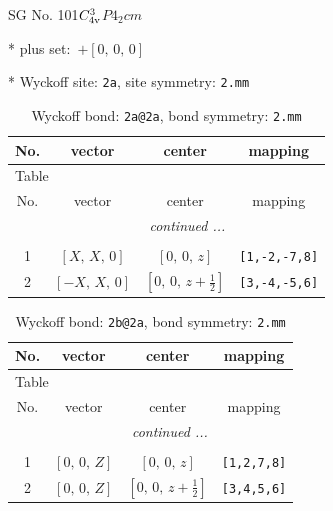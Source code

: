 \documentclass[fleqn,8pt]{jsarticle}
\begin{document}
\setcounter{MaxMatrixCols}{32}

\renewcommand{\tablename}{Table~}
\renewcommand{\figurename}{Figure~}
\begin{center}
\LARGE
SG No. 101\quad$C_{\rm 4v}^{3}$\quad$P4_2cm$\quad[ tetragonal ]
\end{center}

* plus set:\,\,\,$+\left[ 0,\, 0,\, 0 \right]$


* Wyckoff site: {\tt 2a}, site symmetry: {\tt 2.mm}
\renewcommand{\arraystretch}{1.2}
\begin{longtable}{cccc}
\caption{Wyckoff bond: {\tt 2a@2a}, bond symmetry: {\tt 2.mm}}
 \\
 \hline \hline
No. & vector & center & mapping \\ \hline \endfirsthead

\multicolumn{3}{l}{\tablename\ \thetable{}} \\
 \hline \hline
No. & vector & center & mapping \\ \hline \endhead

 \hline \hline
\multicolumn{3}{r}{\footnotesize\it continued ...} \\ \endfoot

 \hline \hline
\multicolumn{3}{r}{} \\ \endlastfoot

1 & $\left[ X,\, X,\, 0 \right]$ & $\left[ 0,\, 0,\, z \right]$ & {\tt [1,-2,-7,8]} \\ \hline
2 & $\left[ - X,\, X,\, 0 \right]$ & $\left[ 0,\, 0,\, z + \frac{1}{2} \right]$ & {\tt [3,-4,-5,6]} \\
\end{longtable}
\renewcommand{\arraystretch}{1.2}
\begin{longtable}{cccc}
\caption{Wyckoff bond: {\tt 2b@2a}, bond symmetry: {\tt 2.mm}}
 \\
 \hline \hline
No. & vector & center & mapping \\ \hline \endfirsthead

\multicolumn{3}{l}{\tablename\ \thetable{}} \\
 \hline \hline
No. & vector & center & mapping \\ \hline \endhead

 \hline \hline
\multicolumn{3}{r}{\footnotesize\it continued ...} \\ \endfoot

 \hline \hline
\multicolumn{3}{r}{} \\ \endlastfoot

1 & $\left[ 0,\, 0,\, Z \right]$ & $\left[ 0,\, 0,\, z \right]$ & {\tt [1,2,7,8]} \\ \hline
2 & $\left[ 0,\, 0,\, Z \right]$ & $\left[ 0,\, 0,\, z + \frac{1}{2} \right]$ & {\tt [3,4,5,6]} \\
\end{longtable}
\end{document}
